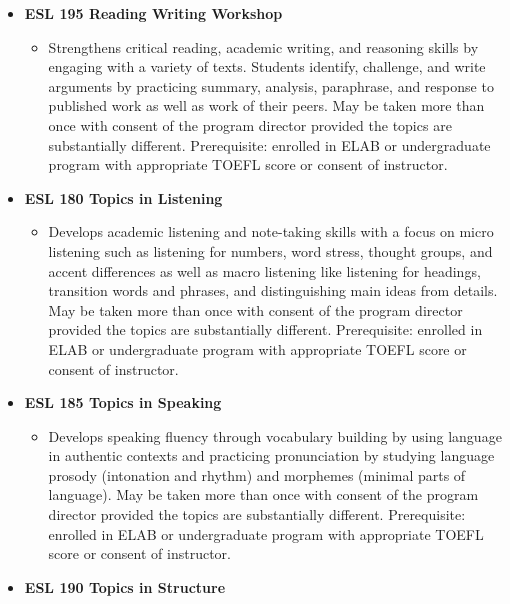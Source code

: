 \documentclass[
  letterpaper,
]{scrbook}
\providecommand{\tightlist}{%
  \setlength{\itemsep}{0pt}\setlength{\parskip}{0pt}}
\begin{document}
\begin{itemize}
\tightlist
\item
  \textbf{ESL 195 Reading Writing Workshop}

  \begin{itemize}
  \tightlist
  \item
    Strengthens critical reading, academic writing, and reasoning skills
    by engaging with a variety of texts. Students identify, challenge,
    and write arguments by practicing summary, analysis, paraphrase, and
    response to published work as well as work of their peers. May be
    taken more than once with consent of the program director provided
    the topics are substantially different. Prerequisite: enrolled in
    ELAB or undergraduate program with appropriate TOEFL score or
    consent of instructor.
  \end{itemize}
\item
  \textbf{ESL 180 Topics in Listening}

  \begin{itemize}
  \tightlist
  \item
    Develops academic listening and note-taking skills with a focus on
    micro listening such as listening for numbers, word stress, thought
    groups, and accent differences as well as macro listening like
    listening for headings, transition words and phrases, and
    distinguishing main ideas from details. May be taken more than once
    with consent of the program director provided the topics are
    substantially different. Prerequisite: enrolled in ELAB or
    undergraduate program with appropriate TOEFL score or consent of
    instructor.
  \end{itemize}
\item
  \textbf{ESL 185 Topics in Speaking}

  \begin{itemize}
  \tightlist
  \item
    Develops speaking fluency through vocabulary building by using
    language in authentic contexts and practicing pronunciation by
    studying language prosody (intonation and rhythm) and morphemes
    (minimal parts of language). May be taken more than once with
    consent of the program director provided the topics are
    substantially different. Prerequisite: enrolled in ELAB or
    undergraduate program with appropriate TOEFL score or consent of
    instructor.
  \end{itemize}
\item
  \textbf{ESL 190 Topics in Structure}


\end{itemize}
\end{document}
